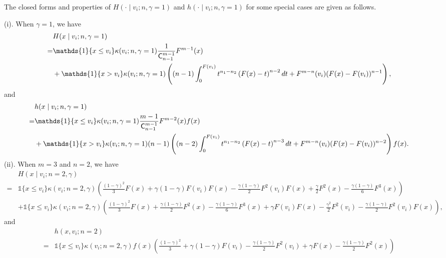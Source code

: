 \begin{corollary}\label{cor:special_case_H_h}
The closed forms and properties of 
$H(\cdot\mid v_i;n,\gamma = 1)$ and $h(\cdot\mid v_i;n,\gamma = 1)$
for some special cases are given as follows.

\medskip


\noindent (i). When $\gamma = 1$, we have 
    \begin{align*}
      &H(x\mid v_i;n,\gamma = 1) \\
      = & \mathds{1}\{x\leq v_i\}\kappa(v_i; n, \gamma = 1)\frac{1}{\C^{m-1}_{n-1}}F^{m-1}(x)\\
      &+ \mathds{1}\{x> v_i\} \kappa(v_i; n, \gamma = 1) \left((n - 1)\int_0^{F(v_i)}t^{n_1-n_2}\left(F(x)-t \right)^{n - 2}dt + F^{m-n}(v_i)(F(x) - F(v_i))^{n - 1} \right),
    \end{align*}
and
{\small {
    \begin{align*}
      &h(x\mid v_i;n,\gamma = 1) \\
      = & \mathds{1}\{x\leq v_i\}\kappa(v_i; n, \gamma = 1)\frac{m-1}{\C^{m-1}_{n-1}}F^{m-2}(x)f(x)\\
      &+ \mathds{1}\{x> v_i\} \kappa(v_i; n, \gamma = 1)(n - 1) \left((n-2)\int_0^{F(v_i)}t^{n_1-n_2}\left(F(x)-t \right)^{n - 3}dt + F^{m-n}(v_i)(F(x) - F(v_i))^{n - 2} \right) f(x).
    \end{align*}}}
\noindent (ii). When $m=3$ and $n=2$, we have
{\scriptsize{
\begin{align*} 
 &H\left(x\mid v_i;n = 2,\gamma\right) \\
 =& \mathds{1} \{x\leq v_i\}\kappa(v_i;n = 2,\gamma)
 \left(\frac{ (1-\gamma)^2}{3} F\left(x\right) + \gamma (1-\gamma)F\left(v_i\right)F\left(x\right)
 - \frac{\gamma(1-\gamma)}{2} F^2\left(v_i\right)F\left(x\right) + \frac{\gamma}{2}  F^2\left(x\right)  - \frac{\gamma(1-\gamma)}{6} F^3\left(x\right)\right)
 \\
 & + \mathds{1}\{x\leq v_i\}\kappa(v_i;n = 2,\gamma)\left(\frac{(1-\gamma)^2}{3}F\left(x\right) + \frac{\gamma(1-\gamma)}{2} F^2\left(x\right) - \frac{\gamma(1-\gamma)}{6} F^3\left(x\right) + \gamma F\left(v_i\right)F\left(x\right) - \frac{\gamma^2}{2} F^2\left(v_i\right) - \frac{\gamma (1-\gamma)}{2} F^2\left(v_i\right) F\left(x\right)\right),
\end{align*}
}
}
and
{\small { 
\begin{align*}
 &h(x,v_i;n=2)\\
 =& \mathds{1}\{x\leq v_i\} \kappa(v_i;n = 2,\gamma) f(x) \left(\frac{ (1-\gamma)^2}{3}  + \gamma (1-\gamma)F\left(v_i\right) - \frac{\gamma(1-\gamma)}{2} F^2\left(v_i\right) + \gamma F\left(x\right) - \frac{\gamma(1-\gamma)}{2} F^2\left(x\right)\right)\\

\end{align*}}}
\end{corollary}
